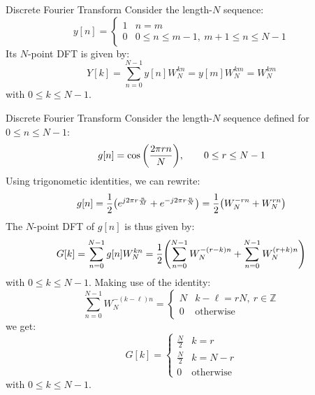 \documentclass[../../main/main.tex]{subfiles}
\begin{document}
\begin{example}{Discrete Fourier Transform}{}
    Consider the length-\( N \) sequence:
    \begin{equation}
        y[n]
        =
        \begin{cases}
            1   &   n=m \\
            0   &   0 \le n \le m-1, \ m+1 \le n \le N-1
        \end{cases}
        \label{eq:L12_S12_1}
    \end{equation}
    Its \( N \)-point DFT is given by:
    \begin{equation}
        Y[k]
        =
        \sum_{n=0}^{N-1} y[n] W_{N}^{kn}
        =
        y[m] W_{N}^{km}
        =
        W_{N}^{km}
        \label{eq:L12_S12_2}
    \end{equation}
    with \( 0 \le k \le N-1 \).
\end{example}

\begin{example}{Discrete Fourier Transform}{}
    Consider the length-\( N \) sequence defined for \( 0 \le n \le N-1 \):
    \begin{equation}
        g[n]
        =
        \cos\qty(\frac{2\pi rn}{N}),
        \qquad
        0 \le r \le N-1
        \label{eq:L12_S13_1}
    \end{equation}
    Using trigonometic identities, we can rewrite:
    \begin{equation}
        g[n]
        =
        \frac{1}{2} \qty(e^{j2\pi r \frac{n}{M}} + e^{-j2\pi r \frac{n}{N}})
        =
        \frac{1}{2} \qty(W_{N}^{-rn} + W_{N}^{rn})
        \label{eq:L12_S13_2}
    \end{equation}
    The \( N \)-point DFT of \( g[n] \) is thus given by:
    \begin{equation}
        G[k]
        =
        \sum_{n=0}^{N-1} g[n] W_{N}^{kn}
        =
        \frac{1}{2} \qty(\sum_{n=0}^{N-1} W_{N}^{-(r-k)n} + \sum_{n=0}^{N-1} W_{N}^{(r+k)n} )
        \label{eq:L12_S14_1}
    \end{equation}
    with \( 0 \le k \le N-1 \). Making use of the identity:
    \begin{equation}
        \sum_{n=0}^{N-1} W_{N}^{-(k-\ell)n}
        =
        \begin{cases}
            N   &   k-\ell = rN, \ r \in \mathbb{Z} \\
            0   &   \text{otherwise}
        \end{cases}
        \label{eq:L12_S15_1}
    \end{equation}
    we get:
    \begin{equation}
        G[k]
        =
        \begin{cases}
            \frac{N}{2} &   k=r \\
            \frac{N}{2} &   k=N-r   \\
            0   &   \text{otherwise}
        \end{cases}
        \label{eq:L12_S15_2}
    \end{equation}
    with \( 0 \le k \le N-1 \).
\end{example}
\end{document}
